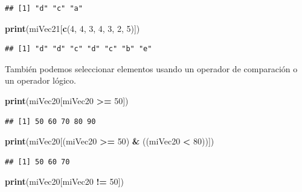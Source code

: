 \documentclass[]{book}
\newenvironment{Shaded}{\begin{snugshade}}{\end{snugshade}}
\newcommand{\KeywordTok}[1]{\textcolor[rgb]{0.13,0.29,0.53}{\textbf{#1}}}
\newcommand{\DecValTok}[1]{\textcolor[rgb]{0.00,0.00,0.81}{#1}}
\newcommand{\StringTok}[1]{\textcolor[rgb]{0.31,0.60,0.02}{#1}}
\newcommand{\OperatorTok}[1]{\textcolor[rgb]{0.81,0.36,0.00}{\textbf{#1}}}
\newcommand{\NormalTok}[1]{#1}
\begin{document}
\begin{verbatim}
## [1] "d" "c" "a"
\end{verbatim}

\begin{Shaded}
\begin{Highlighting}[]
\KeywordTok{print}\NormalTok{(miVec21[}\KeywordTok{c}\NormalTok{(}\DecValTok{4}\NormalTok{, }\DecValTok{4}\NormalTok{, }\DecValTok{3}\NormalTok{, }\DecValTok{4}\NormalTok{, }\DecValTok{3}\NormalTok{, }\DecValTok{2}\NormalTok{, }\DecValTok{5}\NormalTok{)])}
\end{Highlighting}
\end{Shaded}

\begin{verbatim}
## [1] "d" "d" "c" "d" "c" "b" "e"
\end{verbatim}

También podemos seleccionar elementos usando un operador de comparación
o un operador lógico.

\begin{Shaded}
\begin{Highlighting}[]
\KeywordTok{print}\NormalTok{(miVec20[miVec20 }\OperatorTok{>=}\StringTok{ }\DecValTok{50}\NormalTok{])}
\end{Highlighting}
\end{Shaded}

\begin{verbatim}
## [1] 50 60 70 80 90
\end{verbatim}

\begin{Shaded}
\begin{Highlighting}[]
\KeywordTok{print}\NormalTok{(miVec20[(miVec20 }\OperatorTok{>=}\StringTok{ }\DecValTok{50}\NormalTok{) }\OperatorTok{&}\StringTok{ }\NormalTok{((miVec20 }\OperatorTok{<}\StringTok{ }\DecValTok{80}\NormalTok{))])}
\end{Highlighting}
\end{Shaded}

\begin{verbatim}
## [1] 50 60 70
\end{verbatim}

\begin{Shaded}
\begin{Highlighting}[]
\KeywordTok{print}\NormalTok{(miVec20[miVec20 }\OperatorTok{!=}\StringTok{ }\DecValTok{50}\NormalTok{])}
\end{Highlighting}
\end{Shaded}
\end{document}
